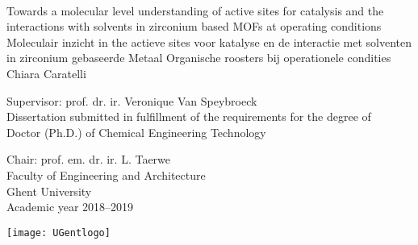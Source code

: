 \documentclass[10pt,twoside]{book}
\begin{document}


% 
 \thispagestyle{empty}   %
% 
\graphicspath{{figures/}}


\newpage\null\thispagestyle{empty}
\newpage\null\thispagestyle{empty}\newpage
\thispagestyle{empty}
% 


{\large \ \vspace{0.25\textheight} \\

\hspace{-\parindent} Towards a molecular level understanding of active sites for catalysis and the interactions with solvents in zirconium based MOFs at operating conditions\\

\hspace{-\parindent} Moleculair inzicht in the actieve sites voor katalyse en de interactie met solventen in zirconium gebaseerde Metaal Organische roosters bij operationele condities \\


\vspace{0.5cm}
\hspace{-\parindent}Chiara Caratelli}

\vspace*{\fill}
\hspace{-\parindent}Supervisor: prof. dr. ir.  Veronique Van Speybroeck \\
\hspace{-\parindent}Dissertation submitted in fulfillment of the requirements
 for the degree of\\
\hspace{-\parindent}Doctor (Ph.D.) of Chemical Engineering Technology\\



\vspace{0.5cm}

 \hspace{-\parindent}\begin{minipage}{0.7\textwidth}
 \hspace{-\parindent}Chair: prof. em. dr. ir. L. Taerwe \\
  \hspace{-\parindent}Faculty of Engineering and Architecture\\
  \hspace{-\parindent}Ghent University\\
  \hspace{-\parindent}Academic year 2018--2019
\end{minipage}
\begin{minipage}{0.3\textwidth}
  \begin{flushright}
    \texttt{[image: UGentlogo]}
  \end{flushright}
\end{minipage}
\end{document}
